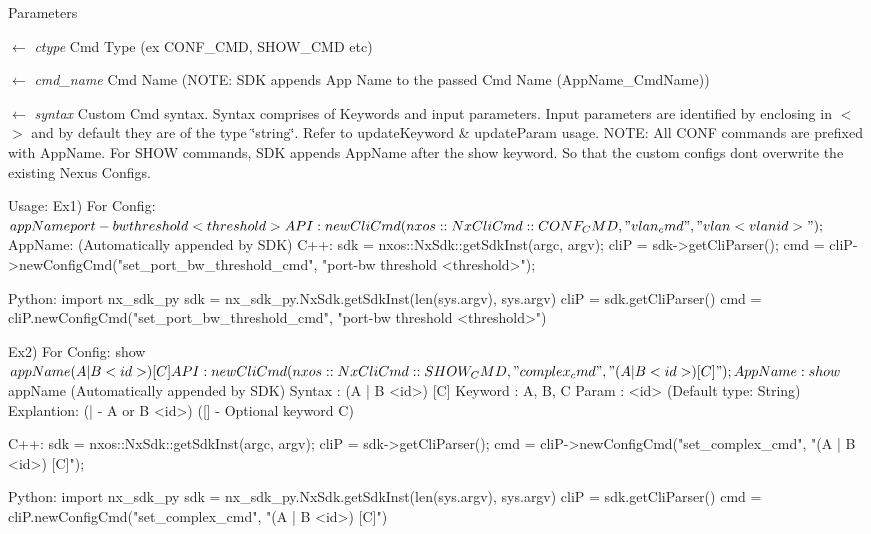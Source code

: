 \begin{DoxyParams}{Parameters}
\item[\mbox{$\leftarrow$} {\em ctype}]Cmd Type (ex CONF\_\-CMD, SHOW\_\-CMD etc) \item[\mbox{$\leftarrow$} {\em cmd\_\-name}]Cmd Name (NOTE: SDK appends App Name to the passed Cmd Name (AppName\_\-CmdName)) \item[\mbox{$\leftarrow$} {\em syntax}]Custom Cmd syntax. Syntax comprises of Keywords and input parameters. Input parameters are identified by enclosing in $<$$>$ and by default they are of the type \char`\"{}string\char`\"{}. Refer to updateKeyword \& updateParam usage. NOTE: All CONF commands are prefixed with AppName. For SHOW commands, SDK appends AppName after the show keyword. So that the custom configs dont overwrite the existing Nexus Configs.\end{DoxyParams}

\begin{DoxyCode}
  Usage:                             
       Ex1) For Config: $appName port-bw threshold <threshold>
             API:  newCliCmd(nxos::NxCliCmd::CONF_CMD, "vlan_cmd", "vlan <vlanid>
      ");
             $AppName: (Automatically appended by SDK)
  C++:
       sdk = nxos::NxSdk::getSdkInst(argc, argv);
       cliP = sdk->getCliParser();
       cmd = cliP->newConfigCmd("set_port_bw_threshold_cmd",
                                    "port-bw threshold <threshold>");

  Python:
       import nx_sdk_py
       sdk = nx_sdk_py.NxSdk.getSdkInst(len(sys.argv), sys.argv)
       cliP = sdk.getCliParser()
       cmd = cliP.newConfigCmd("set_port_bw_threshold_cmd", 
                               "port-bw threshold <threshold>")
\end{DoxyCode}



\begin{DoxyCode}
       Ex2) For Config: show $appName (A | B <id>) [C] 
             API:  newCliCmd(nxos::NxCliCmd::SHOW_CMD, "complex_cmd", "(A | B <id
      >) [C]");
             App Name: show $appName (Automatically appended by SDK)
             Syntax  : (A | B <id>) [C]
                 Keyword   : A, B, C
                 Param     : <id> (Default type: String)
                 Explantion: (| - A or B <id>) 
                             ([] - Optional keyword C)
 
  C++:
       sdk = nxos::NxSdk::getSdkInst(argc, argv);
       cliP = sdk->getCliParser();
       cmd = cliP->newConfigCmd("set_complex_cmd",
                                "(A | B <id>) [C]");

  Python:
       import nx_sdk_py
       sdk = nx_sdk_py.NxSdk.getSdkInst(len(sys.argv), sys.argv)
       cliP = sdk.getCliParser()
       cmd = cliP.newConfigCmd("set_complex_cmd", "(A | B <id>) [C]") 
\end{DoxyCode}


